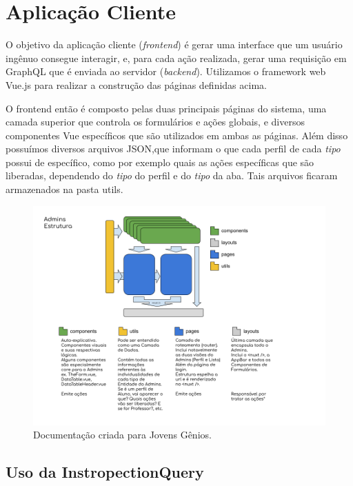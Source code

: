 \section{Aplicação Cliente}

O objetivo da aplicação cliente (\textit{frontend}) é gerar uma interface que um usuário ingênuo consegue interagir, e, para cada ação realizada, gerar uma requisição em GraphQL que é enviada ao servidor (\textit{backend}). Utilizamos o framework web Vue.js para realizar a construção das páginas definidas acima.

O frontend então é composto pelas duas principais páginas do sistema, uma camada superior que controla os formulários e ações globais, e diversos componentes Vue específicos que são utilizados em ambas as páginas. Além disso possuímos diversos arquivos JSON,que informam o que cada perfil de cada \textit{tipo} possui de específico, como por exemplo quais as ações específicas que são liberadas, dependendo do \textit{tipo} do perfil e do \textit{tipo} da aba. Tais arquivos ficaram armazenados na pasta utils.

\begin{figure}[H]
    \centering
    \includegraphics[width=1.0\linewidth]{Imagens/chap04/front-estrutura.png}
    \caption{Documentação criada para Jovens Gênios.}
    \label{fig:profile-exemple}
\end{figure}
    
\subsection{Uso da InstropectionQuery}

